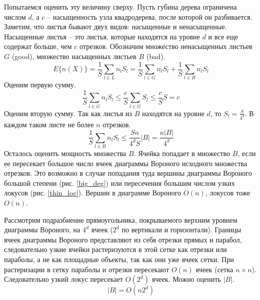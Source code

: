 Попытаемся оценить эту величину сверху. Пусть губина дерева ограничена числом $d$, 
а $c$ -- насыщенность узла квадродерева, после которой он разбивается.
Заметим, что листья бывают двух видов: насыщенные и ненасыщенные. Насыщенные листья -- это
листья, которые находятся на уровне $d$ и все еще содержат больше, чем $c$ отрезков.
Обозначим множество ненасыщенных листьев $G$ (good), множество насыщенных листьев $B$ (bad).
\begin{equation}
E\{n(X)\} = \frac{1}{S}\sum\limits_{l \in L}n_lS_l = 
\label{expectation}
\frac{1}{S}\sum\limits_{l \in G}n_lS_l 
+
\frac{1}{S}\sum\limits_{l \in B}n_lS_l
\end{equation}
Оценим первую сумму.
\begin{equation}
\frac{1}{S}\sum\limits_{l \in G}n_lS_l \le \frac{c}{S}\sum\limits_{l \in G}S_l \le \frac{c}{S}S = c
\label{sum1}
\end{equation}
Оценим вторую сумму. Так как листья из $B$ находятся на уровне $d$, то $S_l = \frac{S}{4^d}$.
В каждом таком листе не более $n$ отрезков.
\begin{equation}
\frac{1}{S}\sum\limits_{l \in B}n_lS_l \le \frac{Sn}{4^dS}|B| = \frac{n|B|}{4^d}
\label{sum2}
\end{equation}
Осталось оценить мощность множества $B$. Ячейка попадает в множество $B$, если ее пересекает
большое число ячеек диаграммы Вороного исходного множества отрезков.
Это возможно в случае попадания туда вершины диаграммы Вороного большой степени (рис. \ref{big_deg})
или пересечения большим числом узких локусов (рис. \ref{thin_loc}). Вершин в диаграмме Вороного
$O(n)$, локусов тоже $O(n)$. 

\FloatBarrier

Рассмотрим подразбиение прямоугольника, покрываемого верхним уровнем 
диаграммы Вороного, на $4^d$ ячеек ($2^d$ по вертикали и горизонтали).
Границы ячеек диаграммы Вороного представляют из себя отрезки прямых и парабол, следовательно
узкие ячейки растеризуются в этой сетке как отрезки или параболы, а не как площадные объекты, 
так как они уже ячеек сетки. При растеризации в сетку параболы и отрезки пересекают $O(n)$ ячеек (сетка $n \times n$).
Следовательно узкий локус пересекает $O(2^d)$ ячеек. Можно оценить $|B|$.
\begin{equation}
|B| = O(n2^d)
\label{bad_segs}
\end{equation}

